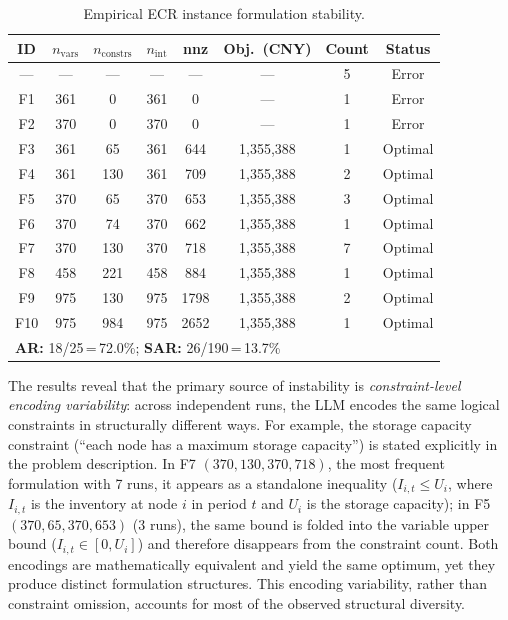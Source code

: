 \documentclass[preprint,12pt]{elsarticle}
\begin{document}
\begin{table}[!htbp]
    \centering
    \small
    \renewcommand{\arraystretch}{1.0}
    \caption{Empirical ECR instance formulation stability.}
    \label{tab:formulation_stability}
    \begin{tabular*}{\textwidth}{@{\extracolsep{\fill}}cccccccc@{}}
        \toprule
        ID & $n_{\text{vars}}$ & $n_{\text{constrs}}$ & $n_{\text{int}}$ & nnz & Obj.\ (CNY) & Count & Status \\
        \midrule
        ---  & --- & --- & --- & --- & --- & 5 & Error \\
        F1 & 361 &   0 & 361 &   0 & --- & 1 & Error \\
        F2 & 370 &   0 & 370 &   0 & --- & 1 & Error \\
        F3 & 361 &  65 & 361 & 644 & 1,355,388 & 1 & Optimal \\
        F4 & 361 & 130 & 361 & 709 & 1,355,388 & 2 & Optimal \\
        F5 & 370 &  65 & 370 & 653 & 1,355,388 & 3 & Optimal \\
        F6 & 370 &  74 & 370 & 662 & 1,355,388 & 1 & Optimal \\
        F7 & 370 & 130 & 370 & 718 & 1,355,388 & 7 & Optimal \\
        F8 & 458 & 221 & 458 & 884 & 1,355,388 & 1 & Optimal \\
        F9 & 975 & 130 & 975 & 1798 & 1,355,388 & 2 & Optimal \\
        F10 & 975 & 984 & 975 & 2652 & 1,355,388 & 1 & Optimal \\
        \midrule
        \multicolumn{8}{l}{\textbf{AR:} 18/25\,=\,72.0\%; \textbf{SAR:} 26/190\,=\,13.7\%} \\
        \bottomrule
    \end{tabular*}
\end{table}

The results reveal that the primary source of instability is \emph{constraint-level encoding variability}: across independent runs, the LLM encodes the same logical constraints in structurally different ways. For example, the storage capacity constraint (``each node has a maximum storage capacity'') is stated explicitly in the problem description. In F7 $(370, 130, 370, 718)$, the most frequent formulation with 7 runs, it appears as a standalone inequality ($I_{i,t} \leq U_i$, where $I_{i,t}$ is the inventory at node $i$ in period $t$ and $U_i$ is the storage capacity); in F5 $(370, 65, 370, 653)$ (3 runs), the same bound is folded into the variable upper bound ($I_{i,t} \in [0, U_i]$) and therefore disappears from the constraint count. Both encodings are mathematically equivalent and yield the same optimum, yet they produce distinct formulation structures. This encoding variability, rather than constraint omission, accounts for most of the observed structural diversity.
\end{document}
